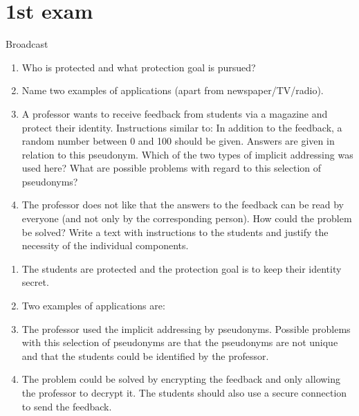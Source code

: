 \documentclass{article}
\begin{document}
\section[2020]{1st exam}
\begin{exercise}{Broadcast}
  \begin{enumerate}
    \item Who is protected and what protection goal is pursued?
    \item Name two examples of applications (apart from newspaper/TV/radio).
    \item A professor wants to receive feedback from students via a magazine and protect their identity. Instructions similar to: In addition to the feedback, a random number between 0 and 100 should be given. Answers are given in relation to this pseudonym. Which of the two types of implicit addressing was used here? What are possible problems with regard to this selection of pseudonyms?
    \item The professor does not like that the answers to the feedback can be read by everyone (and not only by the corresponding person). How could the problem be solved? Write a text with instructions to the students and justify the necessity of the individual components.
  \end{enumerate}

  \begin{solution}
    \begin{enumerate}
      \item The students are protected and the protection goal is to keep their identity secret.
      \item Two examples of applications are:
      \item The professor used the implicit addressing by pseudonyms. Possible problems with this selection of pseudonyms are that the pseudonyms are not unique and that the students could be identified by the professor.
      \item The problem could be solved by encrypting the feedback and only allowing the professor to decrypt it. The students should also use a secure connection to send the feedback.
    \end{enumerate}
  \end{solution}
\end{exercise}
\end{document}
